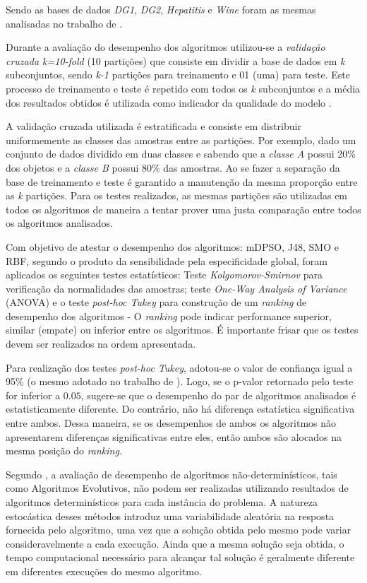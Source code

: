 \documentclass[
	12pt,				%
	openany,			%
	oneside,	
	a4paper,			%
	brazil,				%
	]{unimontes-ppgmsc-abntex2}
\begin{document}
Sendo as bases de dados {\em DG1}, {\em DG2}, {\em Hepatitis} e {\em Wine} foram as mesmas analisadas no trabalho de .

Durante a avaliação do desempenho dos algoritmos utilizou-se a {\em validação cruzada k=10-fold} (10 partições) que consiste em dividir a base de dados em {\em k} subconjuntos, sendo {\em k-1} partições para treinamento e 01 (uma) para teste. Este processo de treinamento e teste é repetido com todos os {\em k} subconjuntos e a média dos resultados obtidos é utilizada como indicador da qualidade do modelo \cite{Castro_2016}.

A validação cruzada utilizada é estratificada e consiste em distribuir uniformemente as classes das amostras entre as partições. Por exemplo, dado um conjunto de dados dividido em duas classes e sabendo que a {\em classe A} possui 20\% dos objetos e a {\em classe B} possui 80\% das amostras. Ao se fazer a separação da base de treinamento e teste é garantido a manutenção da mesma proporção entre as {\em k} partições. Para os testes realizados, as mesmas partições são utilizadas em todos os algoritmos de maneira a tentar prover uma justa comparação entre todos os algoritmos analisados. 

Com objetivo de atestar o desempenho dos algoritmos: mDPSO, J48, SMO e RBF, segundo o produto da sensibilidade pela especificidade global, foram aplicados os seguintes testes estatísticos: Teste {\em Kolgomorov-Smirnov} para verificação da normalidades das amostras; teste {\em One-Way Analysis of Variance} (ANOVA) e o teste {\em post-hoc Tukey} para construção de um {\em ranking} de desempenho dos algoritmos - O {\em ranking} pode indicar performance superior, similar (empate) ou inferior entre os algoritmos. É importante frisar que os testes devem ser realizados na ordem apresentada.

Para realização dos testes  {\em post-hoc Tukey}, adotou-se o valor de confiança igual a 95\% (o mesmo adotado no trabalho de ). Logo, se o p-valor retornado pelo teste for inferior a $0.05$, sugere-se que o desempenho do par de algoritmos analisados é estatisticamente diferente. Do contrário, não há diferença estatística significativa entre ambos. Dessa maneira, se os desempenhos  de ambos os algoritmos não apresentarem diferenças significativas entre eles, então ambos são alocados na mesma posição do {\em ranking}. 

Segundo , a avaliação de desempenho de algoritmos não-determinísticos, tais como Algoritmos Evolutivos, não podem ser realizadas utilizando resultados de algoritmos determinísticos para cada instância do problema. A natureza estocástica desses métodos introduz uma variabilidade aleatória na resposta fornecida pelo algoritmo, uma vez que a solução obtida pelo mesmo pode variar consideravelmente a cada execução. Ainda que a mesma solução seja obtida, o tempo computacional necessário para alcançar tal solução é geralmente diferente em diferentes execuções do mesmo algoritmo.
\end{document}
